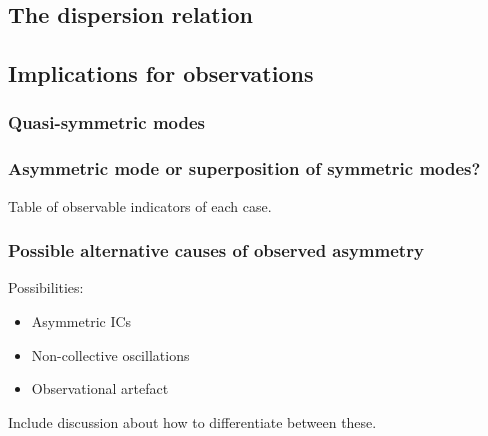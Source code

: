 \documentclass[12pt]{../style-files/ociamthesis}
\begin{document}
\subsection{The dispersion relation}

\subsection{Implications for observations}

\subsubsection{Quasi-symmetric modes}

\subsubsection{Asymmetric mode or superposition of symmetric modes?}
Table of observable indicators of each case.

\subsubsection{Possible alternative causes of observed asymmetry}
Possibilities: 
\begin{itemize}
	\item Asymmetric ICs
	\item Non-collective oscillations
	\item Observational artefact
\end{itemize}
Include discussion about how to differentiate between these.




  
\end{document}

